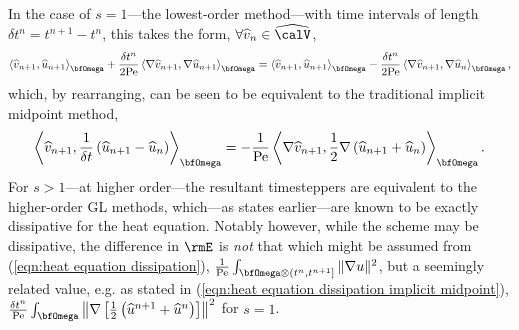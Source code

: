 \begin{example}
        In the case of $s  =  1$---the lowest-order method---with time intervals of length $\delta t^{n} 
         =  t^{n + 1} - t^{n}$, this takes the form, $\forall \widehat{v}_{n}  \in  \widehat{\calV}$,
        \begin{equation}
            \left\langle\widehat{v}_{n + 1}, \widehat{u}_{n + 1}\right\rangle_{\bfOmega} + \frac{\delta t^{n}}{2\rmPe}\left\langle\nabla\widehat{v}_{n + 1}, \nabla\widehat{u}_{n + 1}\right\rangle_{\bfOmega}  =  \left\langle\widehat{v}_{n + 1}, \widehat{u}_{n + 1}\right\rangle_{\bfOmega} - \frac{\delta t^{n}}{2\rmPe}\left\langle\nabla\widehat{v}_{n + 1}, \nabla\widehat{u}_{n}\right\rangle_{\bfOmega},
        \end{equation}
        which, by rearranging, can be seen to be equivalent to the traditional implicit midpoint method,
        \begin{equation}
            \left\langle\widehat{v}_{n + 1}, \frac{1}{\delta t}\left(\widehat{u}_{n + 1} - \widehat{u}_{n}\right)\right\rangle_{\bfOmega}  =  - \frac{1}{\rmPe}\left\langle\nabla\widehat{v}_{n + 1}, \frac{1}{2}\nabla\left(\widehat{u}_{n + 1} + \widehat{u}_{n}\right)\right\rangle_{\bfOmega}.
        \end{equation}
        For $s  >  1$---at higher order---the resultant timesteppers are equivalent to the higher-order GL methods, which---as states earlier---are known to be exactly dissipative for the heat equation. Notably however, while the scheme may be dissipative, the difference in $\rmE$ is \emph{not} that which might be assumed from (\ref{eqn:heat equation dissipation}), $\frac{1}{\rmPe}\int_{\bfOmega\otimes\left(t^{n}, t^{n + 1}\right]}\|\nabla u\|^{2}$, but a seemingly related value, e.g. as stated in (\ref{eqn:heat equation dissipation implicit midpoint}), $\frac{\delta t^{n}}{\rmPe}\int_{\bfOmega}\left\|\nabla\left[\frac{1}{2}\left(\widehat{u}^{n + 1} + \widehat{u}^{n}\right)\right]\right\|^{2}$ for $s = 1$.
    \end{example}